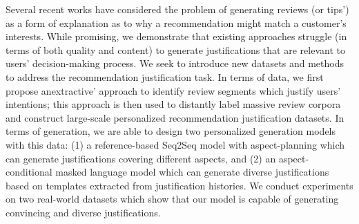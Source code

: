 Several recent works have considered the problem of generating reviews (or tips') as a form of explanation as to why a recommendation might match a customer's interests. While promising, we demonstrate that existing approaches struggle (in terms of both quality and content) to generate justifications that are relevant to users' decision-making process. We seek to introduce new datasets and methods to address the recommendation justification task. In terms of data, we first propose anextractive' approach to identify review segments which justify users' intentions; this approach is then used to distantly label massive review corpora and construct large-scale personalized recommendation justification datasets. In terms of generation, we are able to design two personalized generation models with this data: (1) a reference-based Seq2Seq model with aspect-planning which can generate justifications covering different aspects, and (2) an aspect-conditional masked language model which can generate diverse justifications based on templates extracted from justification histories. We conduct experiments on two real-world datasets which show that our model is capable of generating convincing and diverse justifications.
